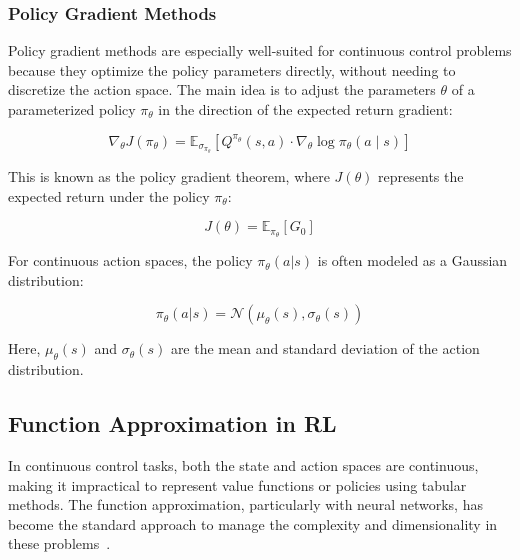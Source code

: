 \subsubsection{Policy Gradient Methods}

Policy gradient methods are especially well-suited for continuous control problems because they optimize the policy parameters directly, without needing to discretize the action space. The main idea is to adjust the parameters $\theta$ of a parameterized policy $\pi_\theta$ in the direction of the expected return gradient\cite{wang2019neural}:

\begin{equation}
\nabla_\theta J(\pi_\theta) = \mathbb{E}_{\sigma_{\pi_\theta}} \left[ Q^{\pi_\theta}(s, a) \cdot \nabla_\theta \log \pi_\theta(a \mid s) \right]
\end{equation}

\noindent This is known as the policy gradient theorem, where $J(\theta)$ represents the expected return under the policy $\pi_\theta$:

\begin{equation}
J(\theta) = \mathbb{E}_{\pi_\theta} \left[G_0\right]
\end{equation}

\noindent For continuous action spaces, the policy $\pi_\theta(a|s)$ is often modeled as a Gaussian distribution:

\begin{equation}
\pi_\theta(a|s) = \mathcal{N}(\mu_\theta(s), \sigma_\theta(s))
\end{equation}

\noindent Here, $\mu_\theta(s)$ and $\sigma_\theta(s)$ are the mean and standard deviation of the action distribution.


\subsection{Function Approximation in \gls{RL}}

In continuous control tasks, both the state and action spaces are continuous, making it impractical to represent value functions or policies using tabular methods. The function approximation, particularly with neural networks, has become the standard approach to manage the complexity and dimensionality in these problems~\cite{gottwald2018neuralvalue}.

